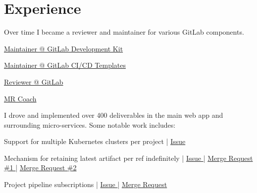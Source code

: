 \documentclass[]{matija-resume}
\begin{document}
\begin{minipage}[t]{1.0\textwidth}


\section{Experience}
\vspace{\topsep}
Over time I became a reviewer and maintainer for various GitLab components.

\vspace{\topsep}
\begin{tightemize}
\item \href{https://gitlab.com/gitlab-org/gitlab-development-kit/}{Maintainer @ GitLab Development Kit }
\item \href{https://gitlab.com/gitlab-org/gitlab/}{Maintainer @ GitLab CI/CD Templates }
\item \href{https://gitlab.com/gitlab-org/gitlab/}{Reviewer @ GitLab }
\item \href{https://about.gitlab.com/job-families/expert/merge-request-coach/}{MR Coach }
\end{tightemize}
\vspace{\topsep}
I drove and implemented over 400 deliverables in the main web app and surrounding micro-services. Some notable work includes:
\vspace{\topsep}
\begin{tightemize}
\item Support for multiple Kubernetes clusters per project | \href{https://gitlab.com/gitlab-org/gitlab/-/issues/3734}{Issue }
\item Mechanism for retaining latest artifact per ref indefinitely | \href{https://gitlab.com/gitlab-org/gitlab/-/issues/16267}{Issue } | \href{https://gitlab.com/gitlab-org/gitlab/-/merge_requests/29802}{Merge Request \#1 } | \href{https://gitlab.com/gitlab-org/gitlab/-/merge_requests/30741}{Merge Request \#2 }
\item Project pipeline subscriptions | \href{https://gitlab.com/gitlab-org/gitlab/-/issues/9045}{Issue } | \href{https://gitlab.com/gitlab-org/gitlab/-/merge_requests/20063}{Merge Request }

\end{tightemize}
\end{minipage}
\end{document}
